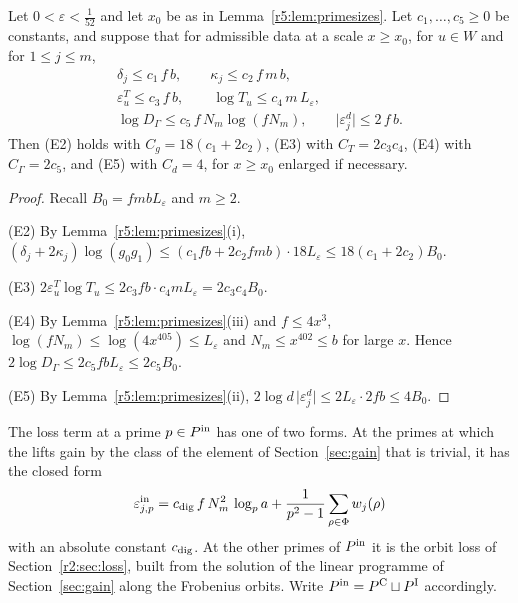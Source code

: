 \begin{lemma}\label{r5:lem:H2toH5}
Let $0<\varepsilon<\frac1{52}$ and let $x_0$ be as in Lemma~\ref{r5:lem:primesizes}. Let $c_1,\dots,c_5\ge0$ be constants, and suppose that for admissible data at a scale $x\ge x_0$, for $u\in W$ and for $1\le j\le m$,
\begin{gather}
\delta_j\le c_1\,f\,b,\qquad\kappa_j\le c_2\,f\,m\,b,\label{r5:Z1}\\
\varepsilon^T_u\le c_3\,f\,b,\qquad\log T_u\le c_4\,m\,L_\varepsilon,\label{r5:Z2}\\
\log D_\Gamma\le c_5\,f\,N_m\log(fN_m),\qquad\lvert\varepsilon^d_j\rvert\le2\,f\,b.\label{r5:Z3}
\end{gather}
Then (E2) holds with $C_g=18(c_1+2c_2)$, (E3) with $C_T=2c_3c_4$, (E4) with $C_\Gamma=2c_5$, and (E5) with $C_d=4$, for $x\ge x_0$ enlarged if necessary.
\end{lemma}

\begin{proof}
Recall $B_0=fmbL_\varepsilon$ and $m\ge2$.

(E2) By Lemma~\ref{r5:lem:primesizes}(i), $(\delta_j+2\kappa_j)\log(g_0g_1)\le(c_1fb+2c_2fmb)\cdot18L_\varepsilon\le18(c_1+2c_2)B_0$.

(E3) $2\varepsilon^T_u\log T_u\le2c_3fb\cdot c_4mL_\varepsilon=2c_3c_4B_0$.

(E4) By Lemma~\ref{r5:lem:primesizes}(iii) and $f\le4x^3$, $\log(fN_m)\le\log(4x^{405})\le L_\varepsilon$ and $N_m\le x^{402}\le b$ for large $x$. Hence $2\log D_\Gamma\le2c_5fbL_\varepsilon\le2c_5B_0$.

(E5) By Lemma~\ref{r5:lem:primesizes}(ii), $2\log d\,\lvert\varepsilon^d_j\rvert\le2L_\varepsilon\cdot2fb\le4B_0$.
\end{proof}

The loss term at a prime $p\in P^{\rm in}$ has one of two forms. At the primes at which the lifts gain by the class of the element of Section~\ref{sec:gain} that is trivial, it has the closed form
\begin{equation}\label{r5:eq:EatC}
\varepsilon^{\rm in}_{j,p}=c_{\rm dig}\,f\,N_m^2\,\log_pa+\frac1{p^2-1}\sum_{\rho\in\Phi}w_j(\rho)
\end{equation}
with an absolute constant $c_{\rm dig}$. At the other primes of $P^{\rm in}$ it is the orbit loss of Section~\ref{r2:sec:loss}, built from the solution of the linear programme of Section~\ref{sec:gain} along the Frobenius orbits. Write $P^{\rm in}=P^{\rm C}\sqcup P^{\rm I}$ accordingly.

